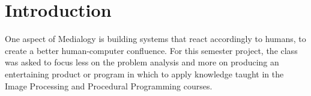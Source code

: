 \chapter{Introduction}
One aspect of Medialogy is building systems that react accordingly to humans, to create a better human-computer confluence. For this semester project, the class was asked to focus less on the problem analysis and more on producing an entertaining product or program in which to apply knowledge taught in the Image Processing and Procedural Programming courses.






